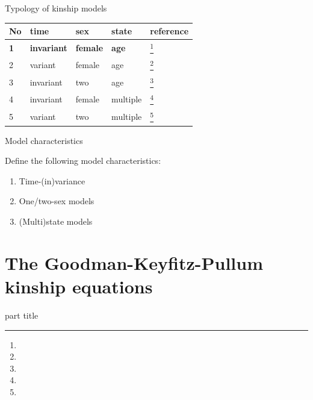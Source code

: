 ﻿\documentclass{beamer}
\newcommand{\fcite}[1]{\footnote{\fullcite{#1}}}
\begin{document}
\begin{frame}{Typology of kinship models}

\begin{table}[]
\begin{tabular}{@{}lllll@{}}
\toprule
No & time      & sex    & state    & reference \\ \midrule
\textbf{1} & \textbf{invariant} & \textbf{female} & \textbf{age} & \fcite{caswell_formal_2019}          \\ 
2 & variant   & female & age & \fcite{caswell_formal_2021}           \\
3 & invariant & two   & age & \fcite{caswell_formal_2022}          \\
4 & invariant   & female   &  multiple & \fcite{caswell_formal_2020}  \\ 
5 & variant   & two   &  multiple & \fcite{williams_demokin_2023}  \\ \bottomrule
\end{tabular}
\end{table}

\end{frame}

\begin{frame}{Model characteristics}
    
    Define the following model characteristics:
    \vspace{0.3cm}
    
    \begin{enumerate}
        \item Time-(in)variance
        \item One/two-sex models
        \item (Multi)state models
    \end{enumerate}
    
\end{frame}

\section{The Goodman-Keyfitz-Pullum kinship equations}
\begin{frame}
    \begin{centering}
    \begin{beamercolorbox}[sep=12pt,center]{part title}
    \insertsection\par
    \end{beamercolorbox}
    \end{centering}
\end{frame}
\end{document}
